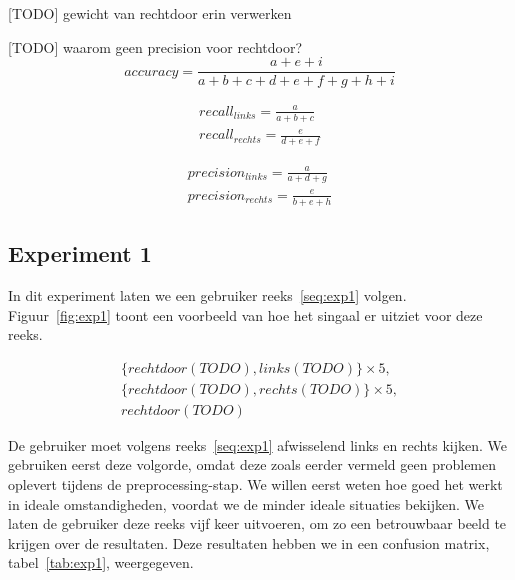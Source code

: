 \documentclass{article}
\begin{document}
[TODO] gewicht van rechtdoor erin verwerken

[TODO] waarom geen precision voor rechtdoor?
\begin{equation}
\label{eq:accuracy}
accuracy = \frac{a + e + i}{a + b + c + d + e + f + g + h + i}
\end{equation}

\begin{equation}
\begin{aligned}
\label{eq:recall}
recall_{links} = \frac{a}{a + b + c} \\
recall_{rechts} = \frac{e}{d + e + f}
\end{aligned}
\end{equation}

\begin{equation}
\begin{aligned}
\label{eq:precision}
precision_{links} = \frac{a}{a + d + g} \\
precision_{rechts} = \frac{e}{b + e + h}
\end{aligned}
\end{equation}

\subsection{Experiment 1}

In dit experiment laten we een gebruiker reeks~\ref{seq:exp1} volgen. Figuur~\ref{fig:exp1} toont een voorbeeld van hoe het singaal er uitziet voor deze reeks. 

\begin{equation}
\begin{aligned}
\label{seq:exp1}
& \{rechtdoor(TODO), links(TODO)\} \times 5,& \\
& \{rechtdoor(TODO), rechts(TODO)\} \times 5,& \\
& rechtdoor(TODO) &
\end{aligned}
\end{equation}

De gebruiker moet volgens reeks~\ref{seq:exp1} afwisselend links en rechts kijken. We gebruiken eerst deze volgorde, omdat deze zoals eerder vermeld geen problemen oplevert tijdens de preprocessing-stap. We willen eerst weten hoe goed het werkt in ideale omstandigheden, voordat we de minder ideale situaties bekijken. We laten de gebruiker deze reeks vijf keer uitvoeren, om zo een betrouwbaar beeld te krijgen over de resultaten. Deze resultaten hebben we in een confusion matrix, tabel~\ref{tab:exp1}, weergegeven.
\end{document}
